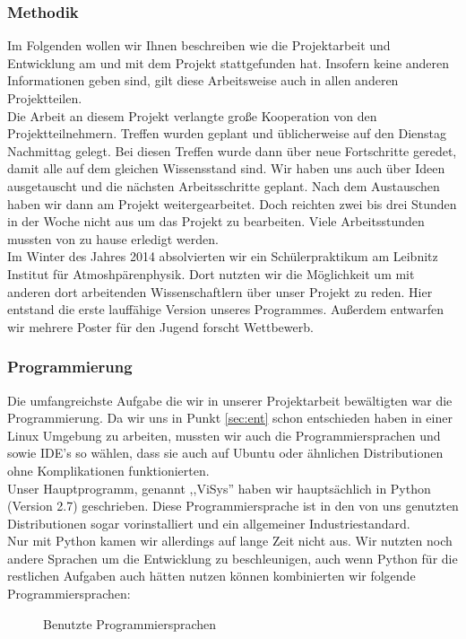 \documentclass[a4paper,oneside,12pt,titlepage]{article}
\newcommand{\jf}{Jugend forscht }
\newcommand{\vs}{ViSys}
\begin{document}
\subsubsection{Methodik} %
Im Folgenden wollen wir Ihnen beschreiben wie die Projektarbeit und Entwicklung am  und mit dem Projekt stattgefunden hat.
Insofern keine anderen Informationen geben sind, gilt diese Arbeitsweise auch in allen anderen Projektteilen. \\
Die Arbeit an diesem Projekt verlangte große Kooperation von den Projektteilnehmern. Treffen wurden geplant und üblicherweise auf den Dienstag Nachmittag gelegt.
Bei diesen Treffen wurde dann über neue Fortschritte geredet, damit alle auf dem gleichen Wissensstand sind. Wir haben uns auch über Ideen ausgetauscht und die nächsten Arbeitsschritte geplant. Nach dem Austauschen haben wir dann am Projekt weitergearbeitet. Doch reichten zwei bis drei Stunden in der Woche nicht aus um das Projekt zu bearbeiten. Viele Arbeitsstunden mussten von zu hause erledigt werden.\\
Im Winter des Jahres 2014 absolvierten wir ein Schülerpraktikum am Leibnitz Institut für Atmoshpärenphysik. %
Dort nutzten wir die Möglichkeit um mit anderen dort arbeitenden Wissenschaftlern über unser Projekt zu reden. Hier entstand die erste lauffähige Version unseres Programmes. Außerdem entwarfen wir mehrere Poster für den \jf Wettbewerb.

\subsubsection{Programmierung}
Die umfangreichste Aufgabe die wir in unserer Projektarbeit bewältigten war die Programmierung. Da wir uns in Punkt \ref{sec:ent}  schon entschieden haben in einer Linux Umgebung zu arbeiten, mussten wir auch die Programmiersprachen und sowie IDE's so wählen, dass sie auch auf Ubuntu oder ähnlichen Distributionen ohne Komplikationen funktionierten.\\
Unser Hauptprogramm, genannt ,,\vs '' haben wir hauptsächlich in Python (Version 2.7) \cite{python27} geschrieben. Diese Programmiersprache ist in den von uns genutzten Distributionen sogar vorinstalliert und ein allgemeiner Industriestandard.\\
Nur mit Python kamen wir allerdings auf lange Zeit nicht aus. Wir nutzten noch andere Sprachen um die Entwicklung zu beschleunigen, auch wenn Python für die restlichen Aufgaben auch hätten nutzen können kombinierten wir folgende Programmiersprachen:
\begin{figure}[H]

\label{fig:pyvi}
\caption{Benutzte Programmiersprachen}
\end{figure}
\end{document}
